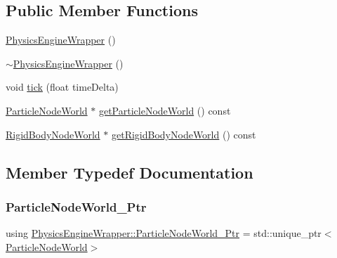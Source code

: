 \subsection*{Public Member Functions}
\begin{DoxyCompactItemize}
\item 
\mbox{\hyperlink{class_physics_engine_wrapper_a9927ccae5bfa6fff5a329bcd55fdb006}{Physics\+Engine\+Wrapper}} ()
\item 
\mbox{\hyperlink{class_physics_engine_wrapper_aa918612e647ac8e0d5510d991752096e}{$\sim$\+Physics\+Engine\+Wrapper}} ()
\item 
void \mbox{\hyperlink{class_physics_engine_wrapper_ab373f860362e7c74dfa0eabfffe10bec}{tick}} (float time\+Delta)
\item 
\mbox{\hyperlink{class_particle_node_world}{Particle\+Node\+World}} $\ast$ \mbox{\hyperlink{class_physics_engine_wrapper_a616efbb6a5a787618e0d07eef552e876}{get\+Particle\+Node\+World}} () const
\item 
\mbox{\hyperlink{class_rigid_body_node_world}{Rigid\+Body\+Node\+World}} $\ast$ \mbox{\hyperlink{class_physics_engine_wrapper_af5d784792df1ea0186bcf21fd0c7d115}{get\+Rigid\+Body\+Node\+World}} () const
\end{DoxyCompactItemize}


\subsection{Member Typedef Documentation}
\mbox{\label{class_physics_engine_wrapper_a842bf2a6668082cbc4568e0212d16cc9}} 
\subsubsection{\texorpdfstring{Particle\+Node\+World\+\_\+\+Ptr}{ParticleNodeWorld\_Ptr}}
{\footnotesize\ttfamily using \mbox{\hyperlink{class_physics_engine_wrapper_a842bf2a6668082cbc4568e0212d16cc9}{Physics\+Engine\+Wrapper\+::\+Particle\+Node\+World\+\_\+\+Ptr}} =  std\+::unique\+\_\+ptr$<$\mbox{\hyperlink{class_particle_node_world}{Particle\+Node\+World}}$>$}

\mbox{\label{class_physics_engine_wrapper_a3c72d58c14dbb32642177a6a7aa73368}} 
